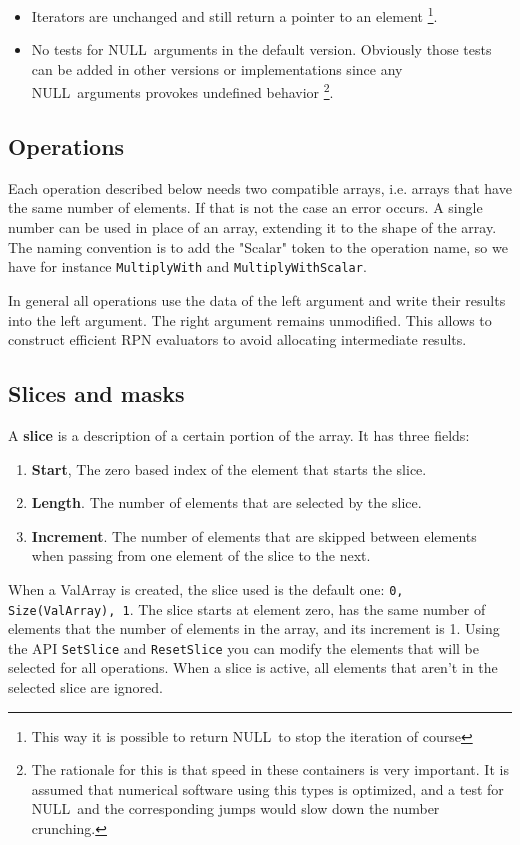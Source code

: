 \documentclass[12pt,a4paper,openany]{memoir} %
\newif\iftth
\newcommand{\Null}{{\iftth \ NULL \else \footnotesize NULL\  \fi}}
\begin{document}
{{\begin{itemize}
types are to be written to the disk: they contain surely no pointers that need to be followed. Their signature is changed.
\item Iterators are unchanged and still return a pointer to an element \footnote{This way it is possible to return \Null to stop the iteration of course}.
\item No tests for \Null arguments in the default version. 
Obviously those tests can be added in other versions or implementations since any \Null arguments
provokes undefined behavior \footnote{The rationale for this is that speed in these containers is very important. It is assumed that numerical software 
using this types is optimized, and a test for \Null and the corresponding jumps would slow down the number crunching.}.
\end{itemize}
\subsection{Operations}
Each operation described below needs two compatible arrays, i.e. arrays that have the same number of elements. If that is not the case an error
occurs. A single number can be used in place of an array, extending it to the shape of the array. The naming convention is to add the "Scalar" token
to the operation name, so we have for instance \texttt{MultiplyWith} and \texttt{MultiplyWithScalar}.

In general all operations use the data of the left argument and write their results into the left argument. The right argument remains unmodified.
This allows to construct efficient RPN evaluators to avoid allocating intermediate results.
\subsection{Slices and masks}
A \textbf{slice} is a description of a certain portion of the array. It has three fields:
\begin{enumerate}
\item \textbf{Start}, The zero based index of the element that starts the slice.
\item \textbf{Length}. The number of elements that are selected by the slice.
\item \textbf{Increment}. The number of elements that are skipped between elements when passing from one element of the slice to the next.
\end{enumerate}
When a ValArray is created, the slice used is the default one: \texttt{0, Size(ValArray), 1}. The slice starts at element zero,
has the same number of elements that the number of elements in the array, and its increment is 1. Using the API \texttt{SetSlice} and
\texttt{ResetSlice} you can modify the elements that will be selected for all operations. When a slice is active, all elements that aren't in the
selected slice are ignored.

}}
\end{document}
